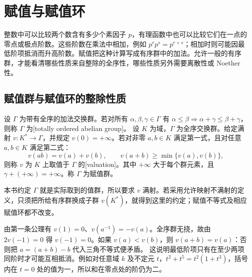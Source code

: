 
\section{赋值与赋值环}
\label{b3:sec:1001}

整数中可以比较两个数含有多少个素因子 \(p\)，有理函数中也可以比较它们在一点的零点或极点阶数。这些阶数在乘法中相加，例如 \(p^r p^s=p^{r+s}\)；相加时则可能因最低阶项抵消而升高阶数。赋值把这种计算写成有序群中的加法。允许一般的有序群，才能看清哪些性质来自整除的全序性，哪些性质另外需要离散性或 Noether 性。


\subsection{赋值群与赋值环的整除性质}
\label{b3:subsec:1001:01}

\begin{definition}\label{b3:def:valuation}
	设 \(\Gamma\) 为带有全序的加法交换群。若对所有 \(\alpha,\beta,\gamma\in\Gamma\) 有 \(\alpha\le\beta\Rightarrow\alpha+\gamma\le\beta+\gamma\)，则称 \(\Gamma\) 为[totally ordered abelian group]。 设 \(K\) 为域，\(\Gamma\) 为全序交换群。给定满射 \(v:K^*\rightarrow\Gamma\)，并规定 \(v(0)=+\infty\)。若对非零 \(a,b\in K\) 满足第一式，且对任意 \(a,b\in K\) 满足第二式：
	\[
		v(ab)=v(a)+v(b),\qquad v(a+b)\ge\min\bigl\{v(a),v(b)\bigr\},
	\]
	则称 \(v\) 为 \(K\) 上取值于 \(\Gamma\) 的[valuation]。其中 \(+\infty\) 大于每个群元素，且 \(\gamma+(+\infty)=+\infty\)。称 \(\Gamma\) 为赋值群。
\end{definition}

本书约定 \(\Gamma\) 就是实际取到的值群，所以要求 \(v\) 满射。若采用允许映射不满射的定义，只须把所给有序群换成子群 \(v(K^*)\)，就得到这里的约定；赋值不等式及相应赋值环都不改变。

\ProseParagraphBreak
由第一条公理有 \(v(1)=0\)、\(v(a^{-1})=-v(a)\)。全序群无挠，故由 \(2v(-1)=0\) 得 \(v(-1)=0\)。如果 \(v(a)<v(b)\)，则 \(v(a+b)=v(a)\)：否则把 \(a=(a+b)-b\) 代入三角不等式便矛盾。 这说明最低阶项只有在至少两项同阶时才可能互相抵消。例如对任意域 \(k\) 及不定元 \(t\)，\(t^2+t^5=t^2(1+t^3)\)，括号内在 \(t=0\) 处的值为一，所以和在零点处的阶仍为二。

